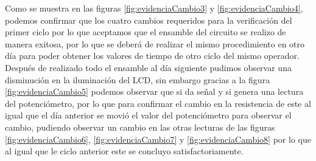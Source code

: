     Como se muestra en las figuras \ref{fig:evidenciaCambio3} y \ref{fig:evidenciaCambio4}, podemos confirmar que los cuatro cambios requeridos para la verificación del primer ciclo por lo que aceptamos que el ensamble del circuito se realizo de manera exitosa, por lo que se deberá de realizar el mismo procedimiento en otro día para poder obtener los valores de tiempo de otro ciclo del mismo operador.
    \\Después de realizado todo el ensamble al día siguiente pudimos observar una disminución en la iluminación del LCD, sin embargo gracias a la figura \ref{fig:evidenciaCambio5} podemos observar que si da señal y si genera una lectura del potenciómetro, por lo que para confirmar el cambio en la resistencia de este al igual que el día anterior se movió el valor del potenciómetro para observar el cambio, pudiendo observar un cambio en las otras lecturas de las figuras \ref{fig:evidenciaCambio6}, \ref{fig:evidenciaCambio7} y \ref{fig:evidenciaCambio8} por lo que al igual que le ciclo anterior este se concluyo satisfactoriamente.

